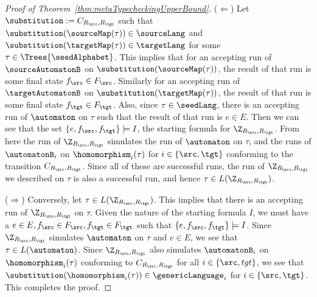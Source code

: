 \begin{proof}[Proof of Theorem~\ref{thm:metaTypecheckingUpperBound}]
    ($\Leftarrow$) Let $\substitution := C_{R_\src, R_\tgt}$ such that $\substitution(\sourceMap(\tau)) \in \sourceLang$ and $\substitution(\targetMap(\tau)) \in \targetLang$ for some $\tau \in \Trees{\seedAlphabet}$. This implies that for an accepting run of $\sourceAutomatonB$ on $\substitution(\sourceMap(\tau))$, the result of that run is some final state $f_\src \in F_\src$. Similarly for an accepting run of $\targetAutomatonB$ on $\substitution(\targetMap(\tau))$, the result of that run is some final state $f_\tgt \in F_\tgt$. Also, since $\tau \in \seedLang$, there is an accepting run of $\automaton$ on $\tau$ such that the result of that run is $e \in E$. Then we can see that the set $\{e, f_\src, f_\tgt\} \models I$, the starting formula for $\Z_{R_\src, R_\tgt}$. From here the run of $\Z_{R_\src, R_\tgt}$ simulates the run of $\automaton$ on $\tau$, and the runs of $\automatonB_i$ on $\homomorphism_i(\tau)$ for $i \in \{\src, \tgt\}$ conforming to the transition $C_{R_\src, R_\tgt}$. Since all of these are successful runs, the run of $\Z_{R_\src, R_\tgt}$ we described on $\tau$ is also a successful run, and hence $\tau \in L(\Z_{R_\src, R_\tgt})$.

    ($\Rightarrow$) Conversely, let $\tau \in L(\Z_{R_\src, R_\tgt})$. This implies that there is an accepting run of $\Z_{R_\src, R_\tgt}$ on $\tau$. Given the nature of the starting formula $I$, we must have a $e \in E, f_\src \in F_\src, f_\tgt \in F_\tgt$ such that $\{e, f_\src, f_\tgt\} \models I$. Since $\Z_{R_\src, R_\tgt}$ simulates $\automaton$ on $\tau$ and $e \in E$, we see that $\tau \in L(\automaton)$. Since $\Z_{R_\src, R_\tgt}$ also simulates $\automatonB_i$ on $\homomorphism_i(\tau)$ conforming to $C_{R_\src, R_\tgt}$ for all $i \in \{\src, tgt\}$, we see that $\substitution(\homomorphism_i(\tau)) \in \genericLanguage_i$ for $i \in \{\src, \tgt\}$. This completes the proof.


\end{proof}
